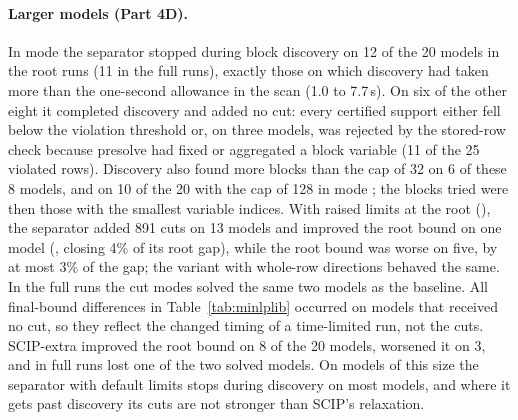 \paragraph{Larger models (Part 4D).} In mode  the separator stopped
during block discovery on 12 of the 20 models in the root runs (11 in the full
runs), exactly those on which
discovery had taken more than the one-second allowance in the scan (1.0 to
7.7\,s). On six of the other eight it completed discovery and added no cut:
every certified support either fell below the violation threshold or, on three
models, was rejected by the stored-row check because presolve had fixed or
aggregated a block variable (11 of the 25 violated rows). Discovery also
found more blocks than the cap of 32 on 6 of these 8 models, and on 10 of the
20 with the cap of 128 in mode ; the blocks tried were then
those with the smallest variable indices. With raised limits
at the root (), the separator added 891 cuts on 13 models and
improved the root bound on one model (, closing 4\%
of its root gap), while the root bound was worse on five, by at most 3\% of the
gap; the variant with whole-row directions behaved the same. In the full runs
the cut modes solved the same two models as the baseline. All final-bound
differences in Table~\ref{tab:minlplib} occurred on models that received no
cut, so they reflect the changed timing of a time-limited run, not the cuts.
SCIP-extra improved the root bound on 8 of the 20 models, worsened it on 3,
and in full runs lost one of the two solved models. On models of this size the
separator with default limits stops during discovery on most models, and
where it gets past discovery its cuts are not stronger than SCIP's
relaxation.
